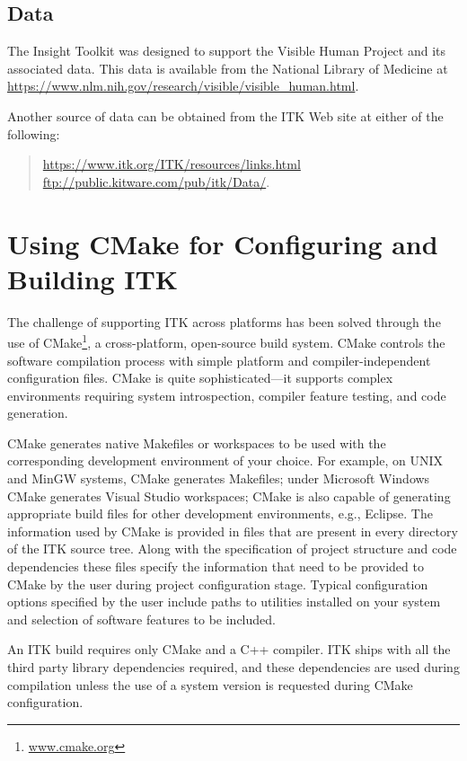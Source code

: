 \subsection{Data}
\label{sec:Data}

The Insight Toolkit was designed to support the Visible Human Project
and its associated data. This data is available from the National Library of
Medicine at \url{https://www.nlm.nih.gov/research/visible/visible_human.html}.

Another source of data can be obtained from the ITK Web site at either
of the following:
\begin{quote}
\url{https://www.itk.org/ITK/resources/links.html} \\
\url{ftp://public.kitware.com/pub/itk/Data/}.
\end{quote}

\section{Using CMake for Configuring and Building ITK}
\label{sec:UsingCMakeForConfiguringAndBuildingITK}

The challenge of supporting ITK across platforms has been solved through the
use of CMake\footnote{\url{www.cmake.org}}, a cross-platform, open-source build
system. CMake controls the software compilation process with simple platform
and compiler-independent configuration files. CMake is quite sophisticated---it
supports complex environments requiring system introspection, compiler feature
testing, and code generation.

CMake generates native Makefiles or workspaces to be used with the corresponding
development environment of your choice. For example, on UNIX and MinGW systems,
CMake generates Makefiles; under Microsoft Windows CMake generates Visual Studio
workspaces; CMake is also capable of generating appropriate build files for
other development environments, e.g., Eclipse. The information used by CMake is
provided in  files that are present in every directory of
the ITK source tree. Along with the specification of project structure and code
dependencies these files specify the information that need to be provided to
CMake by the user during project configuration stage. Typical configuration
options specified by the user include paths to utilities installed on your
system and selection of software features to be included.

An ITK build requires only CMake and a C++ compiler. ITK ships with all the
third party library dependencies required, and these dependencies are used
during compilation unless the use of a system version is requested during CMake
configuration.

